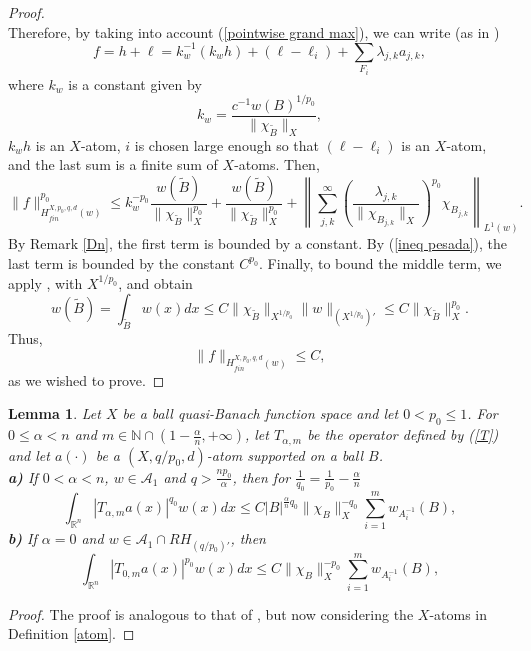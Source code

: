 \documentclass[oneside,10pt]{article}
\newtheorem{lemma}[theorem]{Lemma}
\begin{document}
\begin{proof}
\begin{equation}
\end{equation}
Therefore, by taking into account (\ref{pointwise grand max}), we can write (as in \cite[p. 484]{UrWang})
\[
f = h + \ell = k_{w}^{-1} (k_w h) + (\ell - \ell_i) + \sum_{F_i} \lambda_{j,k} a_{j,k}, 
\]
where $k_w$ is a constant given by
\[
k_w = \frac{c^{-1} w(B)^{1/p_0}}{\| \chi_{\widetilde{B}} \|_{X}},
\] 
$k_w h$ is an $X$-atom, $i$ is chosen large enough so that $(\ell - \ell_i)$ is  an $X$-atom, and the last sum is a finite sum of $X$-atoms. 
Then,
\[
\| f \|_{H^{X, p_0, q, d}_{fin}(w)}^{p_0} \leq k_{w}^{-p_0} \frac{w(\widetilde{B})}{\| \chi_{\widetilde{B}} \|_{X}^{p_0}} + 
\frac{w(\widetilde{B})}{\| \chi_{\widetilde{B}} \|_{X}^{p_0}} +
\left\| \sum_{j,k}^{\infty} \left( \frac{\lambda_{j,k}}{\| \chi_{B_{j,k}} \|_{X}} \right)^{p_0} \chi_{B_{j,k}} \right\|_{L^1(w)}.
\]
By Remark \ref{Dn}, the first term is bounded by a constant. By (\ref{ineq pesada}), the last term is bounded by the constant 
$C^{p_0}$. Finally, to bound the middle term, we apply \cite[Lemma 2.5]{Zhang}, with $X^{1/p_0}$, and obtain
\[
w(\widetilde{B}) = \int_{\widetilde{B}} w(x) dx \leq C \| \chi_{\widetilde{B}} \|_{X^{1/p_0}} \| w \|_{(X^{1/p_0})'} \leq 
C \| \chi_{\widetilde{B}} \|_{X}^{p_0}.
\]
Thus,
\[
\| f \|_{H^{X, p_0, q, d}_{fin}(w)} \leq C,
\]
as we wished to prove.
\end{proof}

\begin{lemma} \label{T atom estim}
Let $X$ be a ball quasi-Banach function space and let $0 < p_0 \leq 1$. For $0 \leq \alpha < n$ and 
$m \in \mathbb{N} \cap \left(1 - \frac{\alpha}{n}, +\infty \right)$, let $T_{\alpha, m}$ be the operator defined by (\ref{T}) and 
let $a(\cdot)$ be a $(X, q/p_0, d)$-atom supported on a ball $B$.\\
\textbf{a)} If $0 < \alpha < n$, $w \in \mathcal{A}_1$ and $q > \frac{n p_0}{\alpha}$, then for $\frac{1}{q_0} = \frac{1}{p_0} - \frac{\alpha}{n}$
\[
\int_{\mathbb{R}^{n}} |T_{\alpha, m} a (x)|^{q_0} w(x) dx \leq C |B|^{\frac{\alpha}{n}q_0} \| \chi_{B} \|_{X}^{-q_0} \sum_{i=1}^{m} 
w_{A_{i}^{-1}}(B),
\]
\textbf{b)} If $\alpha=0$ and $w \in \mathcal{A}_1 \cap RH_{(q/p_0)'}$, then
\[
\int_{\mathbb{R}^{n}} |T_{0, m} a (x)|^{p_0} w(x) dx \leq C \| \chi_{B} \|_{X}^{-p_0} \sum_{i=1}^{m} w_{A_{i}^{-1}}(B),
\]
\end{lemma}

\begin{proof}
The proof is analogous to that of \cite[Lemma 3.2]{Rocha2018}, but now considering the $X$-atoms in Definition \ref{atom}.
\end{proof}
\end{document}
